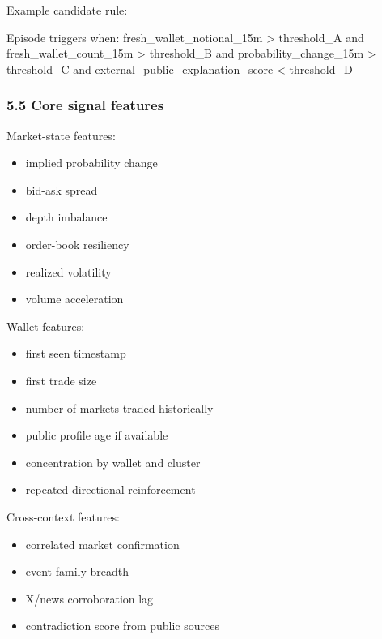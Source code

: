 \documentclass[
]{article}
\newenvironment{Shaded}{}{}
\newcommand{\NormalTok}[1]{#1}
\providecommand{\tightlist}{%
  \setlength{\itemsep}{0pt}\setlength{\parskip}{0pt}}
\begin{document}
Example candidate rule:

\begin{Shaded}
\begin{Highlighting}[]
\NormalTok{Episode triggers when:}
\NormalTok{  fresh\_wallet\_notional\_15m \textgreater{} threshold\_A}
\NormalTok{  and fresh\_wallet\_count\_15m \textgreater{} threshold\_B}
\NormalTok{  and probability\_change\_15m \textgreater{} threshold\_C}
\NormalTok{  and external\_public\_explanation\_score \textless{} threshold\_D}
\end{Highlighting}
\end{Shaded}

\subsubsection{5.5 Core signal features}\label{55-core-signal-features}

Market-state features:

\begin{itemize}
\tightlist
\item
  implied probability change
\item
  bid-ask spread
\item
  depth imbalance
\item
  order-book resiliency
\item
  realized volatility
\item
  volume acceleration
\end{itemize}

Wallet features:

\begin{itemize}
\tightlist
\item
  first seen timestamp
\item
  first trade size
\item
  number of markets traded historically
\item
  public profile age if available
\item
  concentration by wallet and cluster
\item
  repeated directional reinforcement
\end{itemize}

Cross-context features:

\begin{itemize}
\tightlist
\item
  correlated market confirmation
\item
  event family breadth
\item
  X/news corroboration lag
\item
  contradiction score from public sources
\end{itemize}
\end{document}
